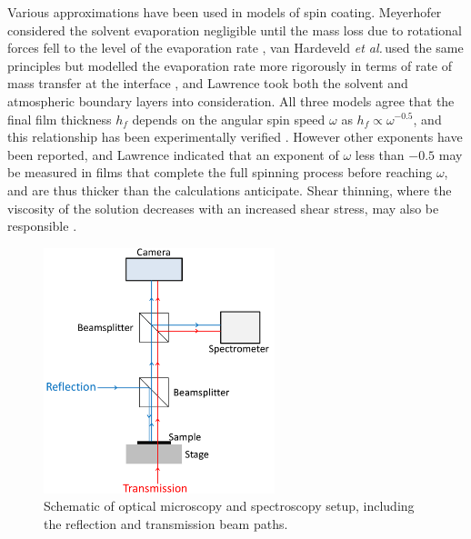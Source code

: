 Various approximations have been used in models of spin coating. Meyerhofer considered the solvent evaporation negligible until the mass loss due to rotational forces fell to the level of the evaporation rate \cite{Meyerhofer1978}, van Hardeveld \textit{et al.\,}used the same principles but modelled the evaporation rate more rigorously in terms of rate of mass transfer at the interface \cite{VanHardeveld1995}, and Lawrence took both the solvent and atmospheric boundary layers into consideration\cite{Lawrence1988}. All three models agree that the final film thickness $h_f$ depends on the angular spin speed $\omega$ as $h_f \propto \omega^{-0.5}$, and this relationship has been experimentally verified \cite{Meyerhofer1978, VanHardeveld1995}. However other exponents have been reported, and Lawrence indicated that an exponent of $\omega$ less than $-0.5$ may be measured in films that complete the full spinning process before reaching $\omega$, and are thus thicker than the calculations anticipate. Shear thinning, where the viscosity of the solution decreases with an increased shear stress, may also be responsible \cite{Lawrence1988}.

\begin{figure}[h!]
\centering    
\includegraphics[width=0.6\textwidth]{Microscope}
\caption{Schematic of optical microscopy and spectroscopy setup, including the reflection and transmission beam paths.}
\label{Microscope}
\end{figure}
